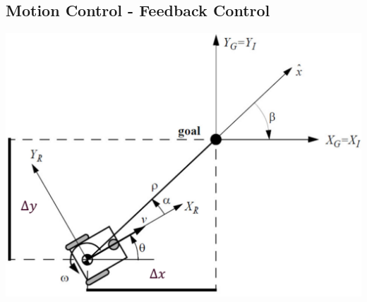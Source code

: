 \subsection{Motion Control - Feedback Control}
    \includegraphics[width=\linewidth]{./Figures/03_MotionControl.png}
